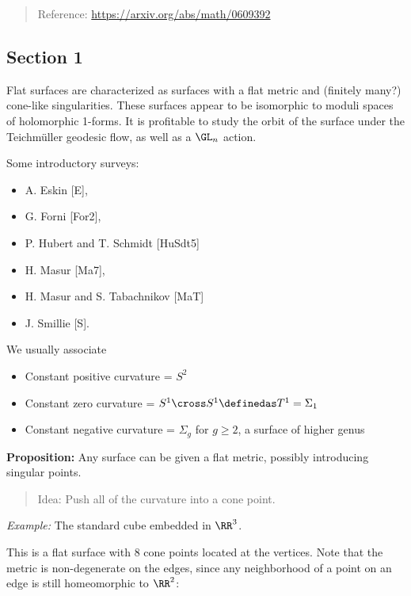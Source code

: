 \begin{quote}
Reference: \url{https://arxiv.org/abs/math/0609392}
\end{quote}

\hypertarget{section-1}{%
\subsection{Section 1}\label{section-1}}

Flat surfaces are characterized as surfaces with a flat metric and
(finitely many?) cone-like singularities. These surfaces appear to be
isomorphic to moduli spaces of holomorphic 1-forms. It is profitable to
study the orbit of the surface under the Teichmüller geodesic flow, as
well as a \(\GL_n\) action.

Some introductory surveys:

\begin{itemize}
\tightlist
\item
  A. Eskin {[}E{]},
\item
  G. Forni {[}For2{]},
\item
  P. Hubert and T. Schmidt {[}HuSdt5{]}
\item
  H. Masur {[}Ma7{]},
\item
  H. Masur and S. Tabachnikov {[}MaT{]}
\item
  J. Smillie {[}S{]}.
\end{itemize}

We usually associate

\begin{itemize}
\tightlist
\item
  Constant positive curvature = \(S^2\)
\item
  Constant zero curvature = \(S^1 \cross S^1 \definedas T^1 = \Sigma_1\)
\item
  Constant negative curvature = \(\Sigma_g\) for \(g\geq 2\), a surface
  of higher genus
\end{itemize}

\textbf{Proposition:} Any surface can be given a flat metric, possibly
introducing singular points.

\begin{quote}
Idea: Push all of the curvature into a cone point.
\end{quote}

\emph{Example:} The standard cube embedded in \(\RR^3\).

This is a flat surface with 8 cone points located at the vertices. Note
that the metric is non-degenerate on the edges, since any neighborhood
of a point on an edge is still homeomorphic to \(\RR^2\):

